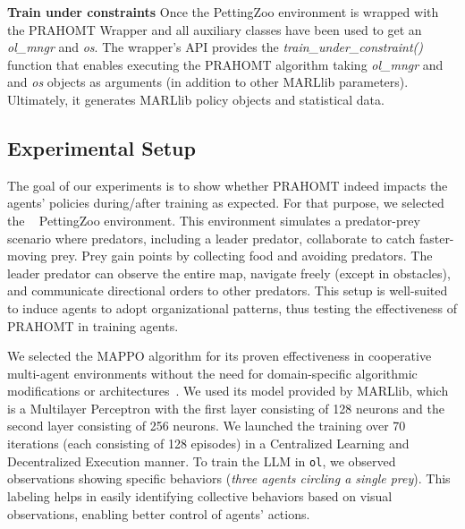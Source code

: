 \documentclass[runningheads]{llncs}
\theoremstyle{freethm}
\theoremstyle{proofoutline}
\begin{document}
\textbf{Train under constraints} \quad Once the PettingZoo environment is wrapped with the PRAHOMT Wrapper and all auxiliary classes have been used to get an \textit{ol\_mngr} and \textit{os}. The wrapper's API provides the \textit{train\_under\_constraint()} function that enables executing the PRAHOMT algorithm taking \textit{ol\_mngr} and and \textit{os} objects as arguments (in addition to other MARLlib parameters). Ultimately, it generates MARLlib policy objects and statistical data.


\subsection{Experimental Setup}

The goal of our experiments is to show whether PRAHOMT indeed impacts the agents' policies during/after training as expected. For that purpose, we selected the ~\cite{Lowe2017} PettingZoo environment. This environment simulates a predator-prey scenario where predators, including a leader predator, collaborate to catch faster-moving prey. Prey gain points by collecting food and avoiding predators. The leader predator can observe the entire map, navigate freely (except in obstacles), and communicate directional orders to other predators. This setup is well-suited to induce agents to adopt organizational patterns, thus testing the effectiveness of PRAHOMT in training agents.



We selected the MAPPO algorithm for its proven effectiveness in cooperative multi-agent environments without the need for domain-specific algorithmic modifications or architectures~\cite{Yu2022}. We used its model provided by MARLlib, which is a Multilayer Perceptron with the first layer consisting of 128 neurons and the second layer consisting of 256 neurons. We launched the training over 70 iterations (each consisting of 128 episodes) in a Centralized Learning and Decentralized Execution manner.
%
To train the LLM in \texttt{ol}, we observed observations showing specific behaviors (\textit{three agents circling a single prey}). This labeling helps in easily identifying collective behaviors based on visual observations, enabling better control of agents' actions.
\end{document}
